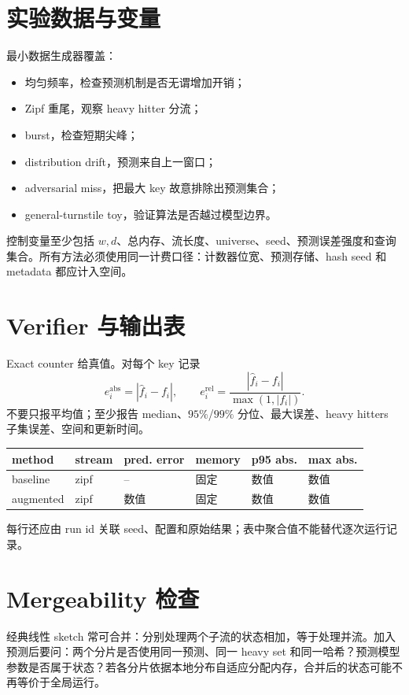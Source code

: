 \section{实验数据与变量}

最小数据生成器覆盖：
\begin{itemize}
  \item 均匀频率，检查预测机制是否无谓增加开销；
  \item Zipf 重尾，观察 heavy hitter 分流；
  \item burst，检查短期尖峰；
  \item distribution drift，预测来自上一窗口；
  \item adversarial miss，把最大 key 故意排除出预测集合；
  \item general-turnstile toy，验证算法是否越过模型边界。
\end{itemize}

控制变量至少包括 $w,d$、总内存、流长度、universe、seed、预测误差强度和查询集合。所有方法必须使用同一计费口径：计数器位宽、预测存储、hash seed 和 metadata 都应计入空间。

\section{Verifier 与输出表}

Exact counter 给真值。对每个 key 记录
\[
e_i^{\mathrm{abs}}=|\widehat f_i-f_i|,
\qquad
e_i^{\mathrm{rel}}=\frac{|\widehat f_i-f_i|}{\max(1,|f_i|)}.
\]
不要只报平均值；至少报告 median、$95\%$/$99\%$ 分位、最大误差、heavy hitters 子集误差、空间和更新时间。

\begin{center}
\begin{tabularx}{0.96\textwidth}{YYYYYY}
\toprule
method & stream & pred. error & memory & p95 abs. & max abs. \\
\midrule
baseline & zipf & -- & 固定 & 数值 & 数值 \\
augmented & zipf & 数值 & 固定 & 数值 & 数值 \\
\bottomrule
\end{tabularx}
\end{center}
每行还应由 run id 关联 seed、配置和原始结果；表中聚合值不能替代逐次运行记录。

\section{Mergeability 检查}

经典线性 sketch 常可合并：分别处理两个子流的状态相加，等于处理并流。加入预测后要问：两个分片是否使用同一预测、同一 heavy set 和同一哈希？预测模型参数是否属于状态？若各分片依据本地分布自适应分配内存，合并后的状态可能不再等价于全局运行。

